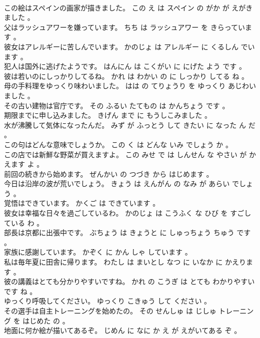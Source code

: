 \documentclass[8pt]{extreport}
\begin{document}
\begin{CJK}{UTF8}{min}
\\	この絵はスペインの画家が描きました。	この え は スペイン の がか が えがきました 。 
\\	父はラッシュアワーを嫌っています。	ちち は ラッシュアワー を きらっています 。 
\\	彼女はアレルギーに苦しんでいます。	かのじょ は アレルギー に くるしん でいます 。 
\\	犯人は国外に逃げたようです。	はんにん は こくがい に にげた よう です 。 
\\	彼は若いのにしっかりしてるね。	かれ は わかい の に しっかり してる ね 。 
\\	母の手料理をゆっくり味わいました。	はは の てりょうり を ゆっくり あじわいました 。 
\\	その古い建物は官庁です。	その ふるい たてもの は かんちょう です 。 
\\	期限までに申し込みました。	きげん まで に もうしこみました 。 
\\	水が沸騰して気体になったんだ。	みず が ふっとう して きたい に なった ん だ 。 
\\	この句はどんな意味でしょうか。	この く は どんな いみ でしょう か 。 
\\	この店では新鮮な野菜が買えますよ。	この みせ で は しんせん な やさい が かえます よ 。 
\\	前回の続きから始めます。	ぜんかい の つづき から はじめます 。 
\\	今日は沿岸の波が荒いでしょう。	きょう は えんがん の なみ が あらい でしょう 。 
\\	覚悟はできています。	かくご は できています 。 
\\	彼女は幸福な日々を過ごしているわ。	かのじょ は こうふく な ひび を すごしている わ 。 
\\	部長は京都に出張中です。	ぶちょう は きょうと に しゅっちょう ちゅう です 。 
\\	家族に感謝しています。	かぞく に かん しゃ しています 。 
\\	私は毎年夏に田舎に帰ります。	わたし は まいとし なつ に いなか に かえります 。 
\\	彼の講義はとても分かりやすいですね。	かれ の こうぎ は とても わかりやすい です ね 。 
\\	ゆっくり呼吸してください。	ゆっくり こきゅう して ください 。 
\\	その選手は自主トレーニングを始めたの。	その せんしゅ は じしゅ トレーニング を はじめた の 。 
\\	地面に何か絵が描いてあるぞ。	じめん に なに か え が えがいてある ぞ 。 

\end{CJK}
\end{document}

